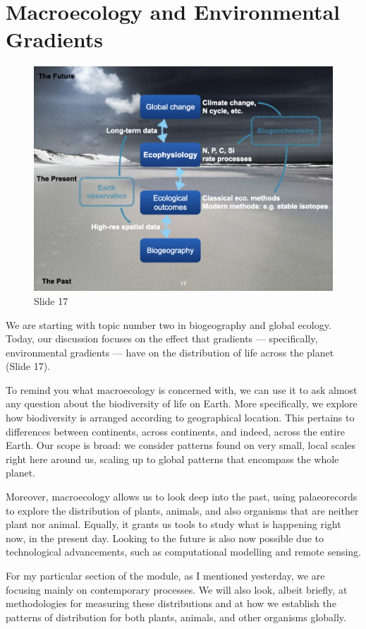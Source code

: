 \documentclass[
  10pt,
]{book}
\begin{document}
\section{Macroecology and Environmental
Gradients}\label{macroecology-and-environmental-gradients}

\begin{figure}[ht]
\centering
\includegraphics[width=0.8\linewidth]{../images/BDC334/BDC334-017.jpeg}
\caption*{Slide 17}
\end{figure}

We are starting with topic number two in biogeography and global
ecology. Today, our discussion focuses on the effect that gradients ---
specifically, environmental gradients --- have on the distribution of
life across the planet (Slide 17).

To remind you what macroecology is concerned with, we can use it to ask
almost any question about the biodiversity of life on Earth. More
specifically, we explore how biodiversity is arranged according to
geographical location. This pertains to differences between continents,
across continents, and indeed, across the entire Earth. Our scope is
broad: we consider patterns found on very small, local scales right here
around us, scaling up to global patterns that encompass the whole
planet.

Moreover, macroecology allows us to look deep into the past, using
palaeorecords to explore the distribution of plants, animals, and also
organisms that are neither plant nor animal. Equally, it grants us tools
to study what is happening right now, in the present day. Looking to the
future is also now possible due to technological advancements, such as
computational modelling and remote sensing.

For my particular section of the module, as I mentioned yesterday, we
are focusing mainly on contemporary processes. We will also look, albeit
briefly, at methodologies for measuring these distributions and at how
we establish the patterns of distribution for both plants, animals, and
other organisms globally.
\end{document}
